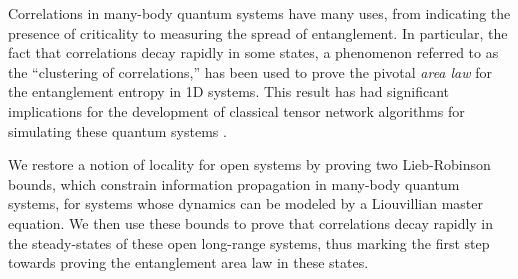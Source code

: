 






Correlations in many-body quantum systems have many uses, from indicating the presence of criticality to measuring the spread of entanglement. In particular, the fact that correlations decay rapidly in some states, a phenomenon referred to as the “clustering of correlations,” has been used to prove the pivotal \emph{area law} for the entanglement entropy in 1D systems. This result has had significant implications for the development of classical tensor network algorithms for simulating these quantum systems \cite{Hastings07}.

We restore a notion of locality for open systems by proving two Lieb-Robinson bounds, which constrain information propagation in many-body quantum systems, for systems whose dynamics can be modeled by a Liouvillian master equation. We then use these bounds to prove that correlations decay rapidly in the steady-states of these open long-range systems, thus marking the first step towards proving the entanglement area law in these states.


